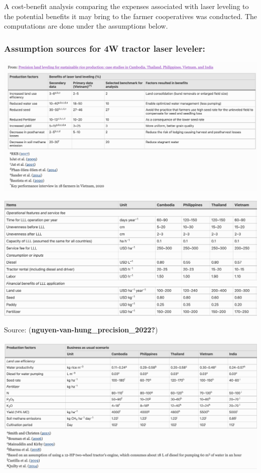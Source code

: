 \documentclass[
]{article}
\begin{document}
A cost-benefit analysis comparing the expenses associated with laser
leveling to the potential benefits it may bring to the farmer
cooperatives was conducted. The computations are done under the
assumptions below.

\hypertarget{assumption-sources-for-4w-tractor-laser-leveler}{%
\subsubsection{Assumption sources for 4W tractor laser
leveler:}\label{assumption-sources-for-4w-tractor-laser-leveler}}

\includegraphics{images/Screenshot 2023-06-19 at 5.34.39 PM-01.png}

\includegraphics{images/Screenshot 2023-06-12 at 9.42.22 PM.png}

Source: (\textbf{nguyen-van-hung\_precision\_2022?})

\includegraphics{images/Screenshot 2023-06-12 at 10.52.03 PM.png}
\end{document}
